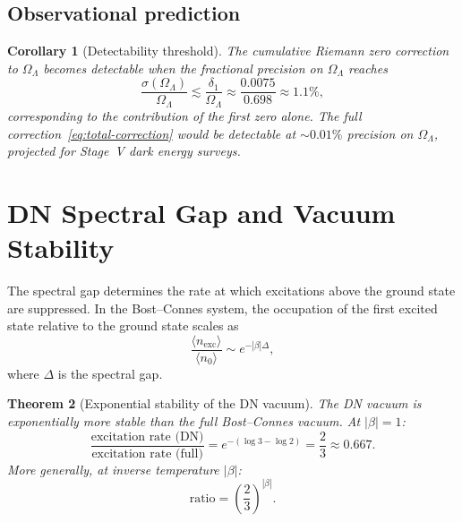 \documentclass[12pt,a4paper]{article}
\newtheorem{theorem}{Theorem}[section]
\newtheorem{corollary}[theorem]{Corollary}
\newcommand{\OL}{\Omega_\Lambda}
\begin{document}
\subsection{Observational prediction}

\begin{corollary}[Detectability threshold]\label{cor:detect}
The cumulative Riemann zero correction to $\OL$ becomes detectable when the fractional precision on $\OL$ reaches
\begin{equation}
  \frac{\sigma(\OL)}{\OL} \lesssim \frac{\delta_1}{\OL} \approx \frac{0.0075}{0.698} \approx 1.1\%,
\end{equation}
corresponding to the contribution of the first zero alone. The full correction~\eqref{eq:total-correction} would be detectable at $\sim 0.01\%$ precision on $\OL$, projected for Stage~V dark energy surveys.
\end{corollary}

\section{DN Spectral Gap and Vacuum Stability}
\label{sec:stability}

The spectral gap determines the rate at which excitations above the ground state are suppressed. In the Bost--Connes system, the occupation of the first excited state relative to the ground state scales as
\begin{equation}
  \frac{\langle n_{\mathrm{exc}}\rangle}{\langle n_0\rangle} \sim e^{-|\beta|\Delta},
\end{equation}
where $\Delta$ is the spectral gap.

\begin{theorem}[Exponential stability of the DN vacuum]\label{thm:stability}
The DN vacuum is exponentially more stable than the full Bost--Connes vacuum. At $|\beta| = 1$:
\begin{equation}
  \frac{\text{excitation rate (DN)}}{\text{excitation rate (full)}} = e^{-(\log 3 - \log 2)} = \frac{2}{3} \approx 0.667.
\end{equation}
More generally, at inverse temperature $|\beta|$:
\begin{equation}
  \text{ratio} = \left(\frac{2}{3}\right)^{|\beta|}.
\end{equation}
\end{theorem}
\end{document}
